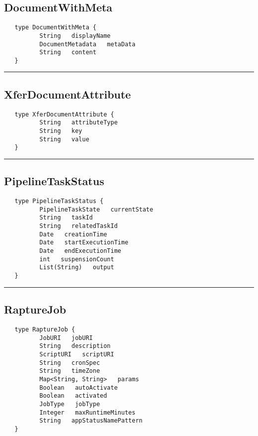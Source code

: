 \subsection{DocumentWithMeta}
\label{type:DocumentWithMeta}

\begin{verbatim}
   type DocumentWithMeta {
          String   displayName
          DocumentMetadata   metaData
          String   content
   }
\end{verbatim}

\rule{15cm}{2pt}
\subsection{XferDocumentAttribute}
\label{type:XferDocumentAttribute}

\begin{verbatim}
   type XferDocumentAttribute {
          String   attributeType
          String   key
          String   value
   }
\end{verbatim}

\rule{15cm}{2pt}
\subsection{PipelineTaskStatus}
\label{type:PipelineTaskStatus}

\begin{verbatim}
   type PipelineTaskStatus {
          PipelineTaskState   currentState
          String   taskId
          String   relatedTaskId
          Date   creationTime
          Date   startExecutionTime
          Date   endExecutionTime
          int   suspensionCount
          List(String)   output
   }
\end{verbatim}

\rule{15cm}{2pt}
\subsection{RaptureJob}
\label{type:RaptureJob}

\begin{verbatim}
   type RaptureJob {
          JobURI   jobURI
          String   description
          ScriptURI   scriptURI
          String   cronSpec
          String   timeZone
          Map<String, String>   params
          Boolean   autoActivate
          Boolean   activated
          JobType   jobType
          Integer   maxRuntimeMinutes
          String   appStatusNamePattern
   }
\end{verbatim}

